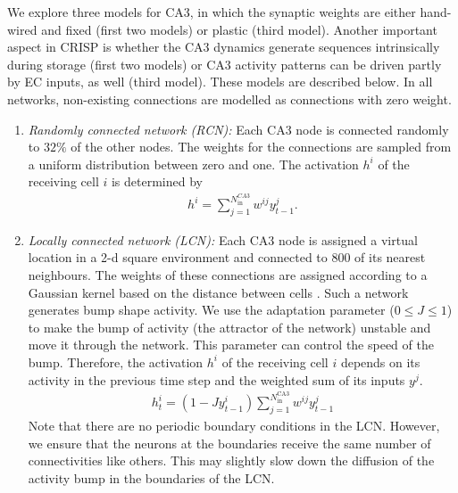 \documentclass[utf8]{frontiersSCNS} %
\begin{document}
We explore three models for CA3, in which the synaptic weights are either hand-wired and fixed (first two models) or plastic (third model). 
%
Another important aspect in CRISP is whether the CA3 dynamics generate sequences intrinsically during storage (first two models) or CA3 activity patterns can be driven partly by EC inputs, as well (third model). 
%
These models are described below.
In all networks, non-existing connections are modelled as connections with zero weight.
%
\begin{enumerate}
\item \textit{Randomly connected network (RCN):} Each CA3 node is connected randomly to $32\%$ of the other nodes. The weights for the connections are sampled from a uniform distribution between zero and one. The activation $h^i$ of the receiving cell $i$ is determined by
%
\begin{align}
	\label{activationRCN}
	h^i = \sum_{j=1}^{N^{CA3}_\mathrm{in}} w^{ij}y^{j}_{t-1}.
\end{align}  
%
\item \textit{Locally connected network (LCN):} Each CA3 node is assigned a virtual location in a 2-d square environment and connected to $800$ of its nearest neighbours. The weights of these connections are assigned according to a Gaussian kernel based on the distance between cells \cite{azizi2013computational}. 
Such a network generates bump shape activity. We use the adaptation parameter ($0 \leq J \leq 1$) to make the bump of activity (the attractor of the network) unstable and move it through the network. This parameter can control the speed of the bump. 
Therefore, the activation $h^i$ of the receiving cell $i$ depends on its activity in the previous time step and the weighted sum of its inputs $y^j$.
%
\begin{align}
\label{activationLCN}
h^{i}_{t} = (1 - J y^{i}_{t-1}) \sum_{j = 1}^{N^\mathrm{CA3}_\mathrm{in}} {{w^{ij} y^{j}_{t-1}}}
\end{align}
%
Note that there are no periodic boundary conditions in the LCN. However, we ensure that the neurons at the boundaries receive the same number of connectivities like others. This may slightly slow down the diffusion of the activity bump in the boundaries of the LCN.


\end{enumerate}
\end{document}
